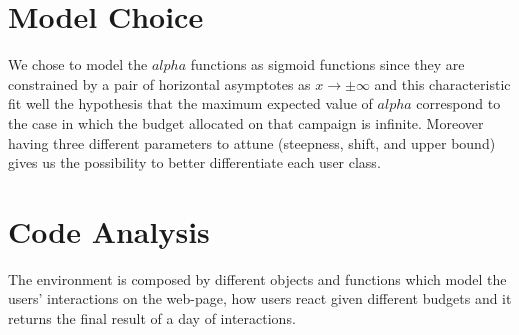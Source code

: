 \section{Model Choice}
\label{sec:env_Motivation}
We chose to model the $alpha$ functions as sigmoid functions since they are constrained by a pair of horizontal asymptotes as $ x\to\pm\infty$  and this characteristic fit well the hypothesis that the maximum expected value of $alpha$ correspond to the case in which the budget allocated on that campaign is infinite. Moreover having three different parameters to attune (steepness, shift, and upper bound) gives us the possibility to better differentiate each user class.

\section{Code Analysis}
\label{sec:env_Code Analysis}

The environment is composed by different objects and functions which model the users' interactions on the web-page, how users react given different budgets and it returns the final result of a day of interactions.
 
